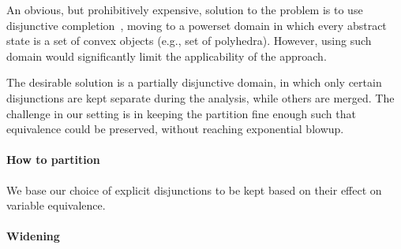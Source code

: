 An obvious, but prohibitively expensive, solution to the problem is to use disjunctive completion~\cite{TODO}, moving to a powerset domain in which every abstract state is a set of convex objects (e.g., set of polyhedra). However, using such domain would significantly limit the applicability of the approach. 

The desirable solution is a partially disjunctive domain, in which only certain disjunctions are kept separate during the analysis, while others are merged. The challenge in our setting is in keeping the partition fine enough such that equivalence could be preserved, without reaching exponential blowup.

\paragraph{How to partition}
We base our choice of explicit disjunctions to be kept based on their effect on variable equivalence. 



\paragraph{Widening} 

